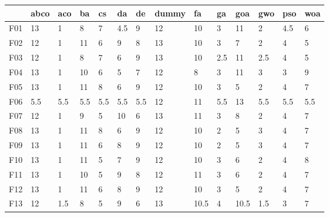 \begin{table}
    \centering
    \begin{adjustbox}{width=\linewidth}
        \begin{tabular}{llllllllllllll}
            \toprule
            {}   & abco   & aco   & ba    & cs    & da    & de    & dummy  & fa    & ga    & goa   & gwo   & pso   & woa   \\
            \midrule
            F01  & 13     & 1     & 8     & 7     & 4.5   & 9     & 12     & 10    & 3     & 11    & 2     & 4.5   & 6     \\
            F02  & 12     & 1     & 11    & 6     & 9     & 8     & 13     & 10    & 3     & 7     & 2     & 4     & 5     \\
            F03  & 12     & 1     & 8     & 7     & 6     & 9     & 13     & 10    & 2.5   & 11    & 2.5   & 4     & 5     \\
            F04  & 13     & 1     & 10    & 6     & 5     & 7     & 12     & 8     & 3     & 11    & 3     & 3     & 9     \\
            F05  & 13     & 1     & 11    & 8     & 6     & 9     & 12     & 10    & 3     & 5     & 2     & 4     & 7     \\
            F06  & 5.5    & 5.5   & 5.5   & 5.5   & 5.5   & 5.5   & 12     & 11    & 5.5   & 13    & 5.5   & 5.5   & 5.5   \\
            F07  & 12     & 1     & 9     & 5     & 10    & 6     & 13     & 11    & 3     & 8     & 2     & 4     & 7     \\
            F08  & 13     & 1     & 11    & 8     & 6     & 9     & 12     & 10    & 2     & 5     & 3     & 4     & 7     \\
            F09  & 13     & 1     & 11    & 6     & 8     & 9     & 12     & 10    & 2     & 5     & 3     & 4     & 7     \\
            F10  & 13     & 1     & 11    & 5     & 7     & 9     & 12     & 10    & 3     & 6     & 2     & 4     & 8     \\
            F11  & 13     & 1     & 10    & 5     & 9     & 8     & 12     & 11    & 3     & 6     & 2     & 4     & 7     \\
            F12  & 13     & 1     & 11    & 6     & 8     & 9     & 12     & 10    & 3     & 5     & 2     & 4     & 7     \\
            F13  & 12     & 1.5   & 8     & 5     & 9     & 6     & 13     & 10.5  & 4     & 10.5  & 1.5   & 3     & 7     \\

\end{tabular}
\end{adjustbox}
\end{table}
